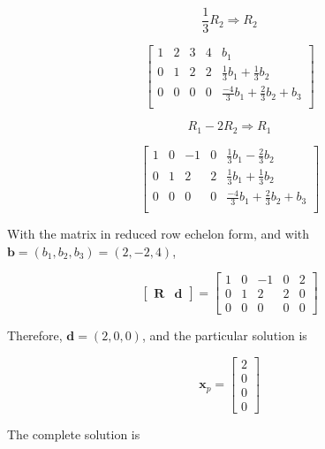 \documentclass[main.tex]{subfiles}
\begin{document}
\begin{enumerate}
\begin{enumerate}
    $$\frac{1}{3} R_2 \Rightarrow R_2$$  

    $$
    \begin{bmatrix} 
    1 & 2 & 3 & 4 & b_1\\
    0 & 1 & 2 & 2 & \frac{1}{3}b_1 + \frac{1}{3}b_2 \\
    0 & 0 & 0 & 0 & \frac{-4}{3}b_1 + \frac{2}{3}b_2 + b_3 \\
    \end{bmatrix}
    $$

    $$R_1 - 2R_2 \Rightarrow R_1$$ 

    $$
    \begin{bmatrix} 
    1 & 0 & -1 & 0 & \frac{1}{3}b_1 - \frac{2}{3}b_2 \\
    0 & 1 & 2 & 2 & \frac{1}{3}b_1 + \frac{1}{3}b_2 \\
    0 & 0 & 0 & 0 & \frac{-4}{3}b_1 + \frac{2}{3}b_2 + b_3 \\
    \end{bmatrix}
    $$

    With the matrix in reduced row echelon form, and with $\textbf{b}=\left(b_1, b_2, b_3\right)=(2,-2,4)$, 

    $$
    \left[\begin{array}{ll}
    \mathbf{R} & \boldsymbol{d}
    \end{array}\right]=\left[\begin{array}{ccccc}
    1 & 0 & -1 & 0 & 2 \\
    0 & 1 & 2 & 2 & 0 \\
    0 & 0 & 0 & 0 & 0
    \end{array}\right]
    $$

    Therefore, $\boldsymbol{d}=(2,0,0)$, and the particular solution is 
    
    $$\textbf{x}_p=\left[\begin{array}{c}2 \\ 0 \\ 0 \\ 0\end{array}\right]$$
    
    The complete solution is
    

\end{enumerate}
\end{enumerate}
\end{document}
